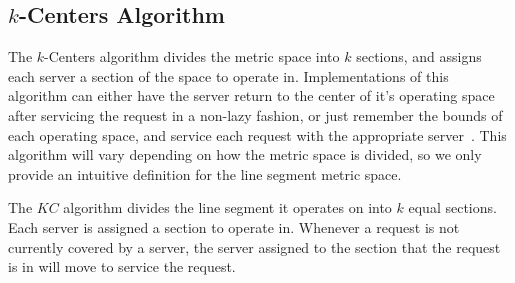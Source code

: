 \subsection{$k$-Centers Algorithm}
\label{sec:KC}
The $k$-Centers algorithm divides the metric space into $k$ sections, and assigns each server a section of the space to operate in. Implementations of this algorithm can either have the server return to the center of it's operating space after servicing the request in a non-lazy fashion, or just remember the bounds of each operating space, and service each request with the appropriate server~\cite{bij2016}. This algorithm will vary depending on how the metric space is divided, so we only provide an intuitive definition for the line segment metric space.

\begin{definition}
    The $KC$ algorithm divides the line segment it operates on into $k$ equal sections. Each server is assigned a section to operate in. Whenever a request is not currently covered by a server, the server assigned to the section that the request is in will move to service the request.
\end{definition}